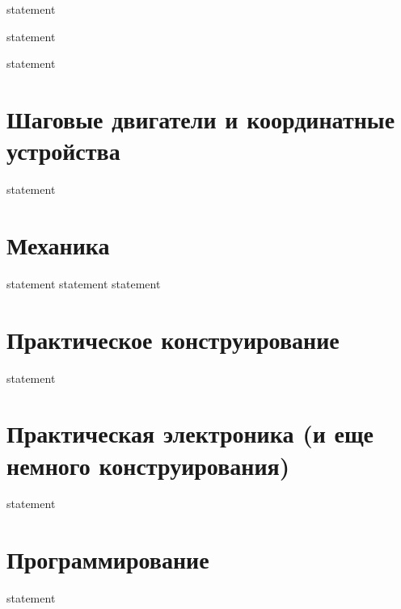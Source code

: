 {statement}

{statement}

{statement}

\section{Шаговые двигатели и координатные устройства}

{statement}
\section{Механика}

{statement}
{statement}
{statement}

\section{Практическое конструирование}

{statement}

\section{Практическая электроника (и еще немного конструирования)}

{statement}

\section{Программирование}

{statement}
